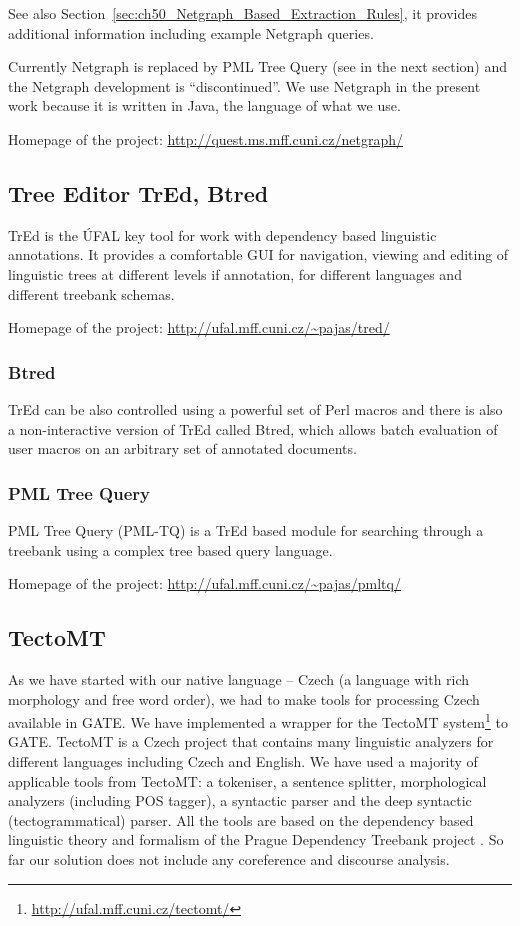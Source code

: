 See also Section~\ref{sec:ch50_Netgraph_Based_Extraction_Rules}, it provides additional information including example Netgraph queries.

Currently Netgraph is replaced by PML Tree Query (see in the next section) and the Netgraph development is ``discontinued''. We use Netgraph in the present work because it is written in Java, the language of what we use.

Homepage of the project: \url{http://quest.ms.mff.cuni.cz/netgraph/}


\subsection{Tree Editor TrEd, Btred}

TrEd is the ÚFAL key tool for work with dependency based linguistic annotations. It provides a comfortable GUI for navigation, viewing and editing of linguistic trees at different levels if annotation, for different languages and different treebank schemas. 

Homepage of the project: \url{http://ufal.mff.cuni.cz/~pajas/tred/}


\subsubsection{Btred}
TrEd can be also controlled using a powerful set of Perl macros and there is also a non-interactive version of TrEd called Btred, which allows batch evaluation of user macros on an arbitrary set of annotated documents.

\subsubsection{PML Tree Query}
PML Tree Query (PML-TQ) \cite{biblio:PaStSystemfor2009} is a TrEd based module for searching through a treebank using a complex tree based query language.

Homepage of the project: \url{http://ufal.mff.cuni.cz/~pajas/pmltq/}


\subsection{TectoMT}
As we have started with our native language -- Czech (a language with rich morphology and free word order), we had to make tools for processing Czech available in GATE. We have implemented a wrapper for the TectoMT system\footnote{\url{http://ufal.mff.cuni.cz/tectomt/}} \citep{biblio:ZaPtTectoMTHighly2008} to GATE. TectoMT is a Czech project that contains many linguistic analyzers for different languages including Czech and English. We have used a majority of applicable tools from TectoMT: a tokeniser, a sentence splitter, morphological analyzers (including POS tagger), a syntactic parser and the deep syntactic (tectogrammatical) parser. All the tools are based on the dependency based linguistic theory and formalism of the Prague Dependency Treebank project \citep{biblio:PDT20_CD}. So far our solution does not include any coreference and discourse analysis.

